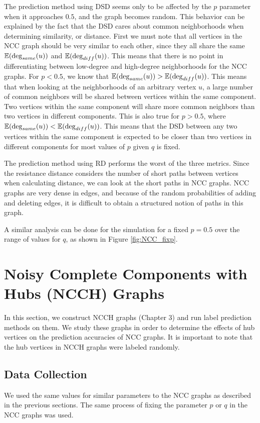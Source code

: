 The prediction method using DSD seems only to be affected by the $p$
parameter when it approaches $0.5$, and the graph becomes random. This
behavior can be explained by the fact that the DSD cares about common
neighborhoods when determining similarity, or distance. First we must note
that all vertices in the NCC graph should be very similar to each other,
since they all share the same $\mathbb{E}(\deg_{same}(u))$ and
$\mathbb{E}(\deg_{diff}(u))$. This means that there is no point in differentiating
between low-degree and high-degree neighborhoods for the NCC graphs.
For $p < 0.5$, we know that $\mathbb{E}(\deg_{same}(u)) > \mathbb{E}(\deg_{diff}(u))$.
This means that when looking at the neighborhoods of an arbitrary vertex 
$u$, a large number of common neighbors will be shared between vertices
within the same component. Two vertices within the same component will 
share more common neighbors than two vertices in different components. This 
is also true for $p > 0.5$, where 
$\mathbb{E}(\deg_{same}(u)) < \mathbb{E}(\deg_{diff}(u))$. This means that the DSD
between any two vertices within the same component is expected to be closer
than two vertices in different components for most values of $p$ given $q$ 
is fixed.

The prediction method using RD performs the worst of the three metrics.
Since the resistance distance considers the number of short paths between
vertices when calculating distance, we can look at the short paths in NCC
graphs. NCC graphs are very dense in edges, and because of the random
probabilities of adding and deleting edges, it is difficult to obtain a
structured notion of paths in this graph.

A similar analysis can be done for the simulation for a fixed $p=0.5$ over
the range of values for $q$, as shown in Figure \ref{fig:NCC_fixp}.


\section{Noisy Complete Components with Hubs (NCCH) Graphs}
In this section, we construct NCCH graphs (Chapter 3) and run label 
prediction methods on them. We study these graphs in order to determine the
effects of hub vertices on the prediction accuracies of NCC graphs. It is
important to note that the hub vertices in NCCH graphs were labeled 
randomly.

\subsection{Data Collection}
We used the same values for similar parameters to the NCC graphs as described in the previous sections. The same process of fixing the parameter $p$ or $q$ in the NCC graphs was used.

